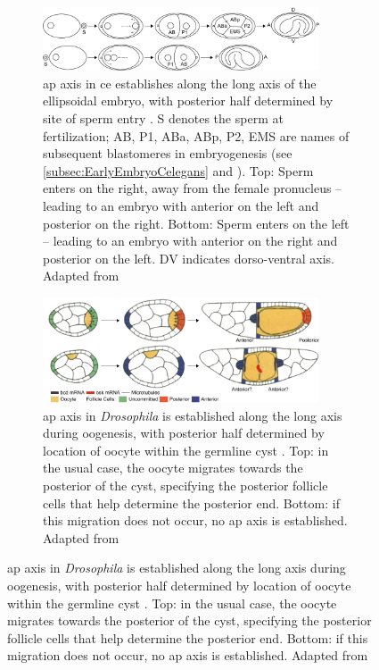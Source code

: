 \begin{figure}[p]

\centering
\begin{subfigure}{\textwidth}
    \centering
    \includegraphics[width=0.9\textwidth]{Introduction/FigureBodyAxesGeometry/celegans.pdf}
    \caption{\acs{ap} axis in \acs{ce} establishes along the long axis of the ellipsoidal embryo, with posterior half determined by site of sperm entry \citep{goldstein1996specification}. S denotes the sperm at fertilization; AB, P1, ABa, ABp, P2, EMS are names of subsequent blastomeres in embryogenesis (see \autoref{subsec:EarlyEmbryoCelegans} and \cite{strome1989generation}). Top: Sperm enters on the right, away from the female pronucleus -- leading to an embryo with anterior on the left and posterior on the right. Bottom: Sperm enters on the left -- leading to an embryo with anterior on the right and posterior on the left. DV indicates dorso-ventral axis. Adapted from \cite{goldstein1997axis}}
    \label{subfig:compareBodyAxesEmbryoGeometry-apAxisCelegans}
\end{subfigure}
\hfill
\begin{subfigure}{\textwidth}
    \centering
    \includegraphics[width=0.9\textwidth]{Introduction/FigureBodyAxesGeometry/drosophila.pdf}
    \caption{\acs{ap} axis in \textit{Drosophila} is established along the long axis during oogenesis, with posterior half determined by location of oocyte within the germline cyst \citep{gonzalez1994role}. Top: in the usual case, the oocyte migrates towards the posterior of the cyst, specifying the posterior follicle cells that help determine the posterior end. Bottom: if this migration does not occur, no \acs{ap} axis is established. Adapted from \cite{gonzalez1994role}}
    \label{subfig:compareBodyAxesEmbryoGeometry-apAxisDrosophila}

\end{subfigure}
\end{figure}
